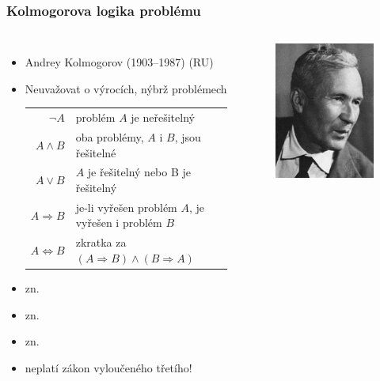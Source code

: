 \documentclass[aspectratio=169]{beamer}
\begin{document}
\begin{frame}
\frametitle{Kolmogorova logika problému}
\begin{columns}
\begin{itemize}
\item Andrey Kolmogorov (1903--1987) (RU)
\item Neuvažovat o výrocích, nýbrž problémech

\begin{table}
\begin{tabular}{ r l }
$\neg A$ & problém $A$ je neřešitelný \\ 
$A \land B$ & oba problémy, $A$ i $B$, jsou řešitelné \\
$A \lor B$ & $A$ je řešitelný nebo B je řešitelný \\
$A \Rightarrow B$ & je-li vyřešen problém $A$, je vyřešen i problém $B$ \\
$A \Leftrightarrow B$ & zkratka za $(A \Rightarrow B) \land (B \Rightarrow A)$ \\
\end{tabular}
\end{table}

\item {} zn. 
\item {} zn. 
\item {} zn. 
\item neplatí zákon vyloučeného třetího!
\end{itemize}

\begin{figure}
\includegraphics[scale=0.45]{kolmogorov}
\end{figure}
\end{columns}
\end{frame}
\end{document}
